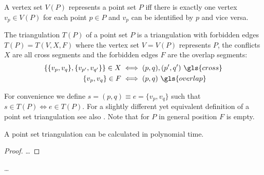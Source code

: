 
\begin{definition}
  A vertex set \(V(P)\) represents a point set \(P\) iff there
  is exactly one vertex \(v_p \in V(P)\) for each point \(p \in P\)
  and \(v_p\) can be identified by \(p\) and vice versa.
%   
\end{definition}

\begin{definition}
  \label{def:point_set_triangulation}
  The triangulation \(T(P)\) of a point set \(P\) is a triangulation
  with forbidden edges \(T(P) = T(V,X,F)\) where the vertex set
  \(V=V(P)\) represents \(P\), the conflicts \(X\) are all
  \gls{cross} segments and the forbidden edges \(F\) are the
  \gls{overlap} segments:
  \begin{alignat*}{1}
    \left\{ \{v_p,v_q\}, \{v_{p'},v_{q'}\} \right\} \in X
    &\iff (p,q), (p',q')~\gls{cross} \\
    \{v_p,v_q\} \in F
    &\iff (p,q)~\gls{overlap}
  \end{alignat*}

  For convenience we define \(s=(p,q) \equiv e=\{v_p,v_q\}\) such
  that \(s \in T(P) \iff e \in T(P)\). For a slightly different yet
  equivalent definition of a point set triangulation see also
  \cite[Section 9.1]{deberg_compgeom}. Note that for \(P\) in general
  position \(F\) is empty.
\end{definition}

\begin{theorem}
  A point set triangulation can be calculated in polynomial time.
\end{theorem}

\begin{proof}
  \ldots{}
\end{proof}

\begin{definition}
  \label{def:constrained_point_set_triangulation}
  \ldots{}
\end{definition}

